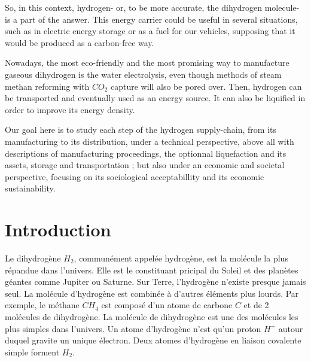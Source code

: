 \documentclass[11pt,french,a4paper]{article}
\makeatletter
\newcommand\mainmatter{%

  \pagenumbering{arabic}}
\makeatother
\begin{document}
So, in this context, hydrogen- or, to be more accurate, the dihydrogen molecule- is a part of the answer. This energy carrier could be useful in several situations, such as in electric energy storage or as a fuel for our vehicles, supposing that it would be produced as a carbon-free way.

Nowadays, the most eco-friendly and the most promising way to manufacture gaseous dihydrogen is the water electrolysis, even though methods of steam methan reforming with $CO_2$ capture will also be pored over. Then, hydrogen can be transported and eventually used as an energy source. It can also be liquified in order to improve its energy density.

Our goal here is to study each step of the hydrogen supply-chain, from its manufacturing to its distribution, under a technical perspective, above all with descriptions of manufacturing proceedings, the optionnal liquefaction and its assets, storage and transportation ; but also  under an economic and societal perspective, focusing on its sociological acceptabillity and its economic sustainability.




\newpage
\tableofcontents

\newpage
















\mainmatter

\section*{Introduction} 

Le dihydrogène $H_2$, communément appelée hydrogène, est la molécule la plus répandue dans l'univers. Elle est le constituant pricipal du Soleil et des planètes géantes comme Jupiter ou Saturne. Sur Terre, l'hydrogène n'existe presque jamais seul. La molécule d'hydrogène est combinée à d'autres éléments plus lourds. Par exemple, le méthane $CH_4$ est composé d'un atome de carbone $C$ et de 2 molécules de dihydrogène. La molécule de dihydrogène est une des molécules les plus simples dans l'univers. Un atome d'hydrogène n'est qu'un proton $H^+$ autour duquel gravite un unique électron. Deux atomes d'hydrogène en liaison covalente simple forment $H_2$.
\end{document}
